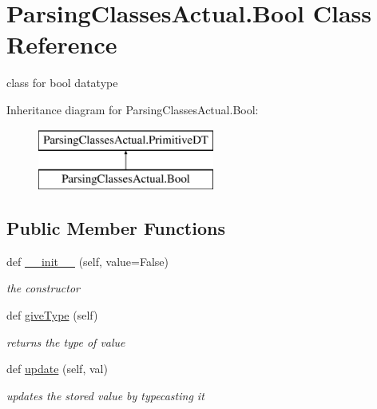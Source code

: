 \hypertarget{class_parsing_classes_actual_1_1_bool}{}\section{Parsing\+Classes\+Actual.\+Bool Class Reference}
\label{class_parsing_classes_actual_1_1_bool}


class for bool datatype  


Inheritance diagram for Parsing\+Classes\+Actual.\+Bool\+:\begin{figure}[H]
\begin{center}
\leavevmode
\includegraphics[height=2.000000cm]{class_parsing_classes_actual_1_1_bool}
\end{center}
\end{figure}
\subsection*{Public Member Functions}
\begin{DoxyCompactItemize}
\item 
def \hyperlink{class_parsing_classes_actual_1_1_bool_aff31c651efc789989951939a86fcc028}{\+\_\+\+\_\+init\+\_\+\+\_\+} (self, value=False)
\begin{DoxyCompactList}\small\item\em the constructor \end{DoxyCompactList}\item 
\mbox{\label{class_parsing_classes_actual_1_1_bool_a1fca505331a7ee21f805b4975058f2ee}} 
def \hyperlink{class_parsing_classes_actual_1_1_bool_a1fca505331a7ee21f805b4975058f2ee}{give\+Type} (self)
\begin{DoxyCompactList}\small\item\em returns the type of value \end{DoxyCompactList}\item 
\mbox{\label{class_parsing_classes_actual_1_1_bool_adde1b520ce9cc387ebefb158b984060b}} 
def \hyperlink{class_parsing_classes_actual_1_1_bool_adde1b520ce9cc387ebefb158b984060b}{update} (self, val)
\begin{DoxyCompactList}\small\item\em updates the stored value by typecasting it \end{DoxyCompactList}\end{DoxyCompactItemize}
